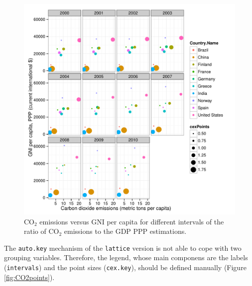 \begin{figure}[htbp]
\centering
\includegraphics[width=.9\linewidth]{figs/CO2pointsGG.pdf}
\caption{\(\mathrm{CO_2}\) emissions versus GNI per capita for different intervals of the ratio of \(\mathrm{CO_2}\) emissions to the GDP PPP estimations. \label{fig:CO2pointsGG}}
\end{figure}

The \texttt{auto.key} mechanism of the \texttt{lattice} version is not able to cope with two grouping variables. Therefore, the legend, whose main componens are the labels (\texttt{intervals}) and the point sizes (\texttt{cex.key}), should be defined manually (Figure \ref{fig:CO2points}). 



